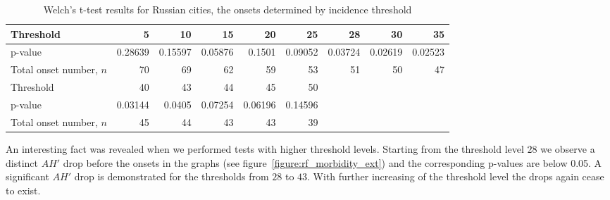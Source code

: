 \documentclass[procedia]{easychair}
\begin{document}
\begin{table}[tb]\small
	\begin{center}
		\begin{tabular}{lrrrrrrrr}
			\hline
			Threshold		& 5 & 10 & 15 & 20 & 25 & 28 & 30 & 35 \\
			\hline      
			p-value			& {\color{red} 0.28639} & {\color{red} 0.15597} & {\color{red} 0.05876} & {\color{red} 0.1501} & {\color{red} 0.09052} & 0.03724 & 0.02619 & 0.02523 \\
			\hline
			Total onset number, $n$ & 70 & 69 & 62 & 59 & 53 & 51 & 50 & 47 \\
			\hline
			\hline
			Threshold		& 40 & 43 & 44 & 45 & 50 \\
			\hline      
			p-value			& 0.03144 & 0.0405 & {\color{red} 0.07254} & {\color{red} 0.06196} & {\color{red} 0.14596} \\
			\hline
			Total onset number, $n$ & 45 & 44 & 43 & 43 & 39 \\
		\end{tabular}
		\caption{Welch's t-test results for Russian cities, the onsets determined by incidence threshold}
		\label{table:rf_ttest}
	\end{center}
\end{table}

An interesting fact was revealed when we performed tests with higher threshold levels. Starting from the threshold level $28 $ we observe a distinct $AH'$ drop before the onsets in the graphs (see figure~\ref{figure:rf_morbidity_ext}) and the corresponding {p-values} are below 0.05. A significant $AH'$ drop is demonstrated for the thresholds from $28 $ to $43 $. With further increasing of the threshold level the drops again cease to exist. 
\end{document}
